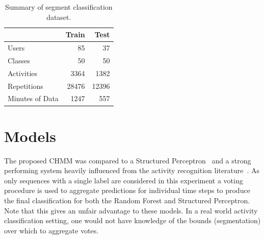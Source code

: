 \documentclass[12pt]{report}
\newcommand{\1}[0]{\mathbbm{1}}
\begin{document}
\begin{table}[ht]
    \centering
    \begin{tabular}{l r r}\hline
    & \textbf{Train} &\textbf{Test} \\\hline
    Users & 85 & 37\\
    Classes & 50 & 50\\
    Activities & 3364 & 1382\\
    Repetitions & 28476 & 12396\\
    Minutes of Data & 1247 & 557\\
    \end{tabular}
    \caption[Summary of segment classification dataset]{
        Summary of segment classification dataset.
    }
    \label{table:segment-dataset}
\end{table}

\section{Models}
The proposed \ac{CHMM} was compared to a Structured Perceptron~\cite{perceptron-collins}
and a strong performing system heavily influenced from the activity recognition literature~\cite{ms-activity}.
As only sequences with a single label are considered in this experiment a voting procedure is used
to aggregate predictions for individual time steps to produce the final classification for both
the Random Forest and Structured Perceptron. Note that this gives an unfair advantage to these
models. In a real world activity classification setting, one would not have knowledge of
the bounds (segmentation) over which to aggregate votes.
\end{document}
